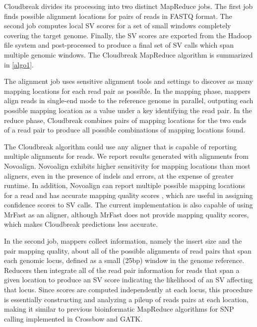 \documentclass[12pt]{article}
\begin{document}
Cloudbreak divides its processing into two distinct MapReduce jobs. The first job finds possible alignment locations for pairs of reads in FASTQ format. The second job computes local SV scores for a set of small windows completely covering the target genome. Finally, the SV scores are exported from the Hadoop file system and post-processed to produce a final set of SV calls which span multiple genomic windows. The Cloudbreak MapReduce algorithm is summarized in \ref{algo1}.

The alignment job uses sensitive alignment tools and settings to discover as many mapping locations for each read pair as possible. In the mapping phase, mappers align reads in single-end mode to the reference genome in parallel, outputing each possible mapping location as a value under a key identifying the read pair. In the reduce phase, Cloudbreak combines pairs of mapping locations for the two ends of a read pair to produce all possible combinations of mapping locations found. 

The Cloudbreak algorithm could use any aligner that is capable of reporting multiple alignments for reads. We report results generated with alignments from Novoalign. \cite{novoalign} Novoalign exhibits higher sensitivity for mapping locations than most aligners, even in the presence of indels and errors, at the expense of greater runtime. \cite{Krawitz:2010iq} In addition, Novoalign can report multiple possible mapping locations for a read and has accurate mapping quality scores \cite{Ruffalo:2011p1758}, which are useful in assigning confidence scores to SV calls. The current implementation is also capable of using MrFast \cite{Alkan:2009cr} as an aligner, although MrFast does not provide mapping quality scores, which makes Cloudbreak predictions less accurate.

In the second job, mappers collect information, namely the insert size and the pair mapping quality, about all of the possible alignments of read pairs that span each genomic locus, defined as a small (25bp) window in the genome reference. Reducers then integrate all of the read pair information for reads that span a given location to produce an SV score indicating the likelihood of an SV affecting that locus. Since scores are computed independently at each locus, this procedure is essentially constructing and analyzing a pileup of reads pairs at each location, making it similar to previous bioinformatic MapReduce algorithms for SNP calling implemented in Crossbow \cite{Langmead:2009p1225} and GATK. \cite{McKenna:2010p1051}
\end{document}
